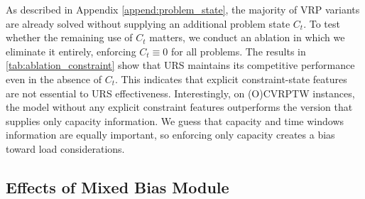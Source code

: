 \documentclass{article}
\theoremstyle{plain}
\theoremstyle{definition}
\theoremstyle{remark}
\begin{document}
\begin{table}[htbp]
  \centering
  \caption{Performance impact of removing the problem state feature $C_t$}
  \label{tab:ablation_constraint}%
\end{table}%

As described in Appendix \ref{append:problem_state}, the majority of VRP variants are already solved without supplying an additional problem state $C_t$. To test whether the remaining use of $C_t$ matters, we conduct an ablation in which we eliminate it entirely, enforcing $C_t\equiv0$ for all problems. The results in \cref{tab:ablation_constraint} show that URS maintains its competitive performance even in the absence of $C_t$. This indicates that explicit constraint-state features are not essential to URS effectiveness. Interestingly, on (O)CVRPTW instances, the model without any explicit constraint features outperforms the version that supplies only capacity information. We guess that capacity and time windows information are equally important, so enforcing only capacity creates a bias toward load considerations.

\subsection{Effects of Mixed Bias Module}
\label{append:ablation_mbm}
\end{document}
